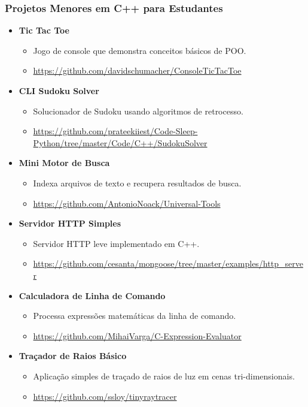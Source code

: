 \documentclass[aspectratio=169]{beamer}
\begin{document}
\begin{frame}
    \frametitle{Projetos Menores em C++ para Estudantes}

    \begin{itemize}
        \item \textbf{Tic Tac Toe}
        \begin{itemize}
            \item Jogo de console que demonstra conceitos básicos de POO.
            \item \url{https://github.com/davidschumacher/ConsoleTicTacToe} 
        \end{itemize}

        \item \textbf{CLI Sudoku Solver}
        \begin{itemize}
            \item Solucionador de Sudoku usando algoritmos de retrocesso.
            \item {\tiny\url{https://github.com/prateekiiest/Code-Sleep-Python/tree/master/Code/C++/SudokuSolver} 
            }
        \end{itemize}

        \item \textbf{Mini Motor de Busca}
        \begin{itemize}
            \item Indexa arquivos de texto e recupera resultados de busca.
            \item \url{https://github.com/AntonioNoack/Universal-Tools} 
        \end{itemize}

        \item \textbf{Servidor HTTP Simples}
        \begin{itemize}
            \item Servidor HTTP leve implementado em C++.
            \item {\tiny \url{https://github.com/cesanta/mongoose/tree/master/examples/http\_server} }
        \end{itemize}

        \item \textbf{Calculadora de Linha de Comando}
        \begin{itemize}
            \item Processa expressões matemáticas da linha de comando.
            \item \url{https://github.com/MihaiVarga/C-Expression-Evaluator}
        \end{itemize}

        \item \textbf{Traçador de Raios Básico}
        \begin{itemize}
            \item Aplicação simples de traçado de raios de luz em cenas tri-dimensionais.
            \item \url{https://github.com/ssloy/tinyraytracer} 
        \end{itemize}
    \end{itemize}
\end{frame}
\end{document}
